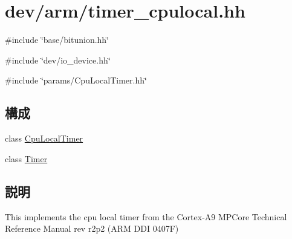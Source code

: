 \hypertarget{timer__cpulocal_8hh}{
\section{dev/arm/timer\_\-cpulocal.hh}
\label{timer__cpulocal_8hh}
}
{\ttfamily \#include \char`\"{}base/bitunion.hh\char`\"{}}\par
{\ttfamily \#include \char`\"{}dev/io\_\-device.hh\char`\"{}}\par
{\ttfamily \#include \char`\"{}params/CpuLocalTimer.hh\char`\"{}}\par
\subsection*{構成}
\begin{DoxyCompactItemize}
\item 
class \hyperlink{classCpuLocalTimer}{CpuLocalTimer}
\item 
class \hyperlink{classCpuLocalTimer_1_1Timer}{Timer}
\end{DoxyCompactItemize}


\subsection{説明}
This implements the cpu local timer from the Cortex-\/A9 MPCore Technical Reference Manual rev r2p2 (ARM DDI 0407F) 